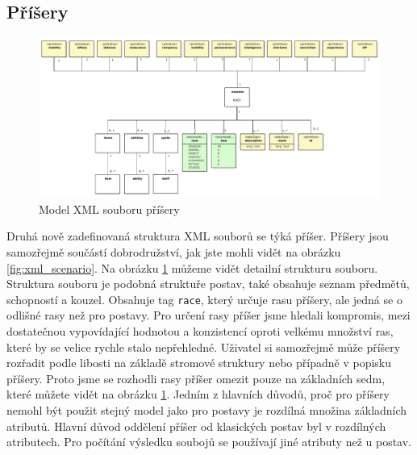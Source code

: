 \documentclass[thesis=B,czech]{resources/FITthesis}[2012/06/26]
\begin{document}
\subsection{Příšery}
\begin{figure}\centering
	\includegraphics[width=1\textwidth]{images/monsterXML}
	\caption[Model XML souboru příšery]{Model XML souboru příšery}\label{fig:xml_monster}
\end{figure}
Druhá nově zadefinovaná struktura XML souborů se týká příšer. Příšery jsou samozřejmě součástí dobrodružství, jak jste mohli vidět na obrázku \ref{fig:xml_scenario}. Na obrázku \ref{fig:xml_monster} můžeme vidět detailní strukturu souboru. Struktura souboru je podobná struktuře postav, také obsahuje seznam předmětů, schopností a kouzel. Obsahuje tag \texttt{race}, který určuje rasu příšery, ale jedná se o odlišné rasy než pro postavy. Pro určení rasy příšer jsme hledali kompromis, mezi dostatečnou vypovídající hodnotou a konzistencí oproti velkému množství ras, které by se velice rychle stalo nepřehledné. Uživatel si samozřejmě může příšery rozřadit podle libosti na základě stromové struktury nebo případně v popisku příšery. Proto jsme se rozhodli rasy příšer omezit pouze na základních sedm, které můžete vidět na obrázku \ref{fig:xml_monster}. Jedním z hlavních důvodů, proč pro příšery nemohl být použit stejný model jako pro postavy je rozdílná množina základních atributů. Hlavní důvod oddělení příšer od klasických postav byl v rozdílných atributech. Pro počítání výsledku soubojů se používají jiné atributy než u postav. 
\end{document}
